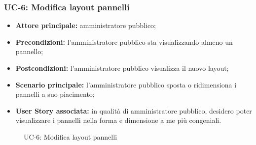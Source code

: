 \documentclass[8pt]{article}
\begin{document}
\subsubsection*{UC-6: Modifica layout pannelli}
\begin{itemize}
    \item \textbf{Attore principale:} amministratore pubblico;
    \item \textbf{Precondizioni:} l'amministratore pubblico sta visualizzando almeno un pannello;
    \item \textbf{Postcondizioni:} l’amministratore pubblico visualizza il nuovo layout;
    \item \textbf{Scenario principale: }l’amministratore pubblico sposta o ridimensiona i pannelli a
        suo piacimento;
    \item \textbf{User Story associata:} in qualità di amministratore pubblico, desidero poter
        visualizzare i pannelli nella forma e dimensione a me più congeniali.
\end{itemize}

\begin{figure}[ht!]
    \centering
    \caption{UC-6: Modifica layout pannelli}
    \label{fig:UC-6: Modifica layout pannelli}
\end{figure}
\end{document}
